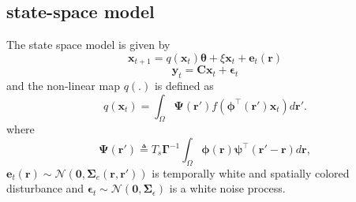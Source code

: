 \documentclass[]{article}
\begin{document}
\subsection{state-space model}
The state space model is given by
\begin{equation}
 \mathbf x_{t+1}=q(\mathbf x_t)\boldsymbol\theta+\xi \mathbf x_t+\boldsymbol e_t(\mathbf r)
\end{equation}
\begin{equation}
 \mathbf y_t=\mathbf C \mathbf x_t+\boldsymbol \epsilon_t
\end{equation}
and the non-linear map $q(.)$ is defined as
\begin{equation}\label{eq:QmatrixForSigmapoints}
	q(\mathbf{x}_t) = \int_\Omega \boldsymbol{\Psi}(\mathbf{r}') f(\boldsymbol{\phi}^{\top}(\mathbf{r}')\mathbf{x}_t) d\mathbf{r}'.
\end{equation}
where
\begin{equation}\label{eq:DefPsi}
	\boldsymbol{\Psi}(\mathbf{r}') \triangleq T_s\boldsymbol{\Gamma}^{-1}\int_\Omega {\boldsymbol{\phi}(\mathbf{r})\boldsymbol{\psi}^{\top} (\mathbf{r}'-\mathbf{r})d\mathbf{r}},
\end{equation}
$ \boldsymbol e_t(\mathbf r)\sim \mathcal N(\mathbf 0,\boldsymbol\Sigma_e(\mathbf r,\mathbf r'))$ is temporally white and spatially colored disturbance and  $\boldsymbol\epsilon_t\sim \mathcal N(\mathbf 0,\boldsymbol\Sigma_{\epsilon})$ is a white noise process.
\end{document}
